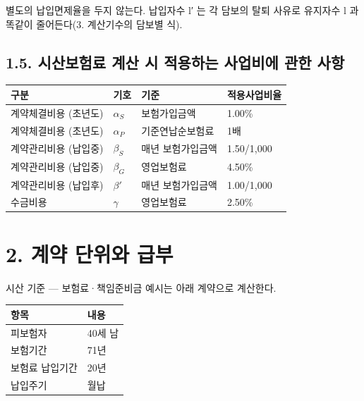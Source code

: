 \documentclass[10pt,a4paper]{article}
\begin{document}
별도의 납입면제율을 두지 않는다. 납입자수 l′ 는 각 담보의 탈퇴 사유로 유지자수 l 과 똑같이 줄어든다(3. 계산기수의 담보별 식).

\subsection*{1.5. 시산보험료 계산 시 적용하는 사업비에 관한 사항}

\begin{center}\small
\begin{tabular}{|l|l|l|l|}
\hline
\textbf{구분} & \textbf{기호} & \textbf{기준} & \textbf{적용사업비율} \\
\hline
계약체결비용 (초년도) & $\alpha_S$ & 보험가입금액 & 1.00\% \\
계약체결비용 (초년도) & $\alpha_P$ & 기준연납순보험료 & 1배 \\
계약관리비용 (납입중) & $\beta_S$ & 매년 보험가입금액 & 1.50/1,000 \\
계약관리비용 (납입중) & $\beta_G$ & 영업보험료 & 4.50\% \\
계약관리비용 (납입후) & $\beta'$ & 매년 보험가입금액 & 1.00/1,000 \\
수금비용 & $\gamma$ & 영업보험료 & 2.50\% \\
\hline
\end{tabular}
\end{center}

\section*{2. 계약 단위와 급부}

시산 기준 — 보험료·책임준비금 예시는 아래 계약으로 계산한다.

\begin{center}\small
\begin{tabular}{|l|l|}
\hline
\textbf{항목} & \textbf{내용} \\
\hline
피보험자 & 40세 남 \\
보험기간 & 71년 \\
보험료 납입기간 & 20년 \\
납입주기 & 월납 \\
\hline
\end{tabular}
\end{center}

\begin{center}\small
{}
\end{center}
\end{document}
